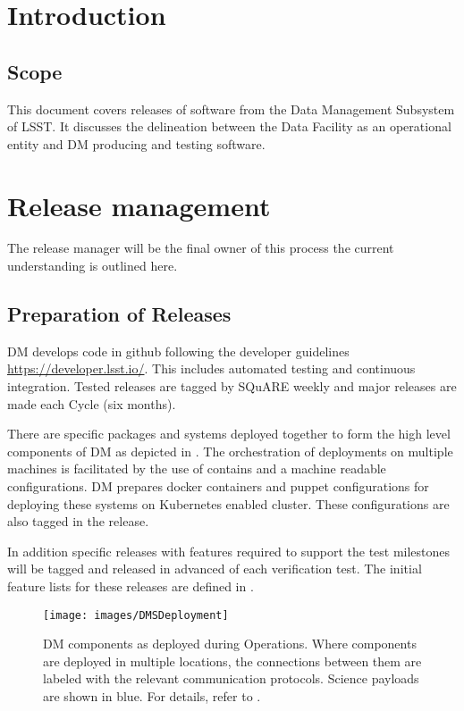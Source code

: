 

\section{Introduction}
\subsection{Scope}
This document covers releases of software from the Data Management Subsystem of LSST.
It discusses the delineation between the Data Facility as an operational entity and DM producing and testing software.

\section{Release management}\label{sect:relman}

The release manager will be the final owner of this process the current understanding is outlined  here.

\subsection{Preparation of Releases}\label{sect:relprep}
DM develops code in github following the developer guidelines \url{https://developer.lsst.io/}.
This includes automated testing and continuous integration. Tested releases are tagged by SQuARE
weekly and major releases are made each Cycle (six months).

There are specific packages and systems deployed together to form the high level components of DM as depicted in . The orchestration of deployments on multiple machines is facilitated by the use of contains and a machine readable configurations. DM prepares docker containers and puppet configurations for deploying these systems on Kubernetes enabled cluster. These configurations are also tagged in the release.

In addition specific releases with features required to support the \cite{LDM-503} test milestones will be tagged and released in advanced of each verification test. The initial feature lists for these releases are defined in .




\begin{figure}[htbp]
        \begin{center}
                \texttt{[image: images/DMSDeployment]}
                \caption{DM components as deployed during Operations. Where components are
                        deployed in multiple locations, the connections between them are labeled with
                        the relevant communication protocols. Science payloads are shown in blue.
            For details, refer to .
                \label{fig:dmsdeploy}}
        \end{center}
\end{figure}


